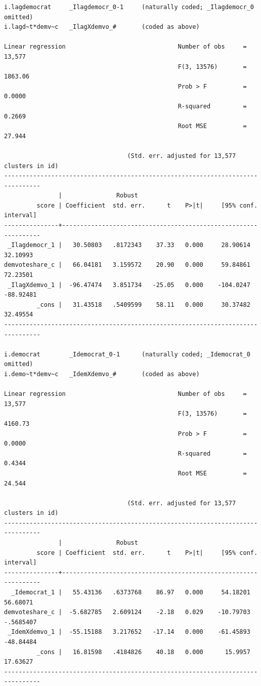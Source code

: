 \documentclass[
]{book}
\begin{document}
\begin{verbatim}
i.lagdemocrat     _Ilagdemocr_0-1     (naturally coded; _Ilagdemocr_0 omitted)
i.lagd~t*demv~c   _IlagXdemvo_#       (coded as above)

Linear regression                               Number of obs     =     13,577
                                                F(3, 13576)       =    1863.06
                                                Prob > F          =     0.0000
                                                R-squared         =     0.2669
                                                Root MSE          =     27.944

                                  (Std. err. adjusted for 13,577 clusters in id)
--------------------------------------------------------------------------------
               |               Robust
         score | Coefficient  std. err.      t    P>|t|     [95% conf. interval]
---------------+----------------------------------------------------------------
 _Ilagdemocr_1 |   30.50803   .8172343    37.33   0.000     28.90614    32.10993
demvoteshare_c |   66.04181   3.159572    20.90   0.000     59.84861    72.23501
 _IlagXdemvo_1 |  -96.47474   3.851734   -25.05   0.000    -104.0247   -88.92481
         _cons |   31.43518   .5409599    58.11   0.000     30.37482    32.49554
--------------------------------------------------------------------------------

i.democrat        _Idemocrat_0-1      (naturally coded; _Idemocrat_0 omitted)
i.demo~t*demv~c   _IdemXdemvo_#       (coded as above)

Linear regression                               Number of obs     =     13,577
                                                F(3, 13576)       =    4160.73
                                                Prob > F          =     0.0000
                                                R-squared         =     0.4344
                                                Root MSE          =     24.544

                                  (Std. err. adjusted for 13,577 clusters in id)
--------------------------------------------------------------------------------
               |               Robust
         score | Coefficient  std. err.      t    P>|t|     [95% conf. interval]
---------------+----------------------------------------------------------------
  _Idemocrat_1 |   55.43136   .6373768    86.97   0.000     54.18201    56.68071
demvoteshare_c |  -5.682785   2.609124    -2.18   0.029    -10.79703   -.5685407
 _IdemXdemvo_1 |  -55.15188   3.217652   -17.14   0.000    -61.45893   -48.84484
         _cons |   16.81598   .4184826    40.18   0.000      15.9957    17.63627
--------------------------------------------------------------------------------


\end{verbatim}
\end{document}
